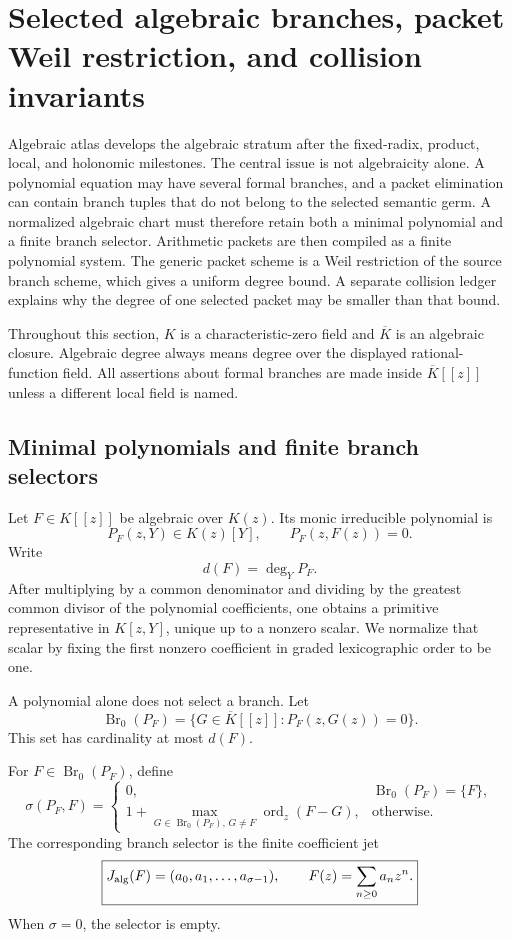 \section{Selected algebraic branches, packet Weil restriction, and collision invariants}
\label{sec:block10-algebraic}

Algebraic atlas develops the algebraic stratum after the fixed-radix, product, local, and holonomic milestones.  The central issue is not algebraicity alone.  A polynomial equation may have several formal branches, and a packet elimination can contain branch tuples that do not belong to the selected semantic germ.  A normalized algebraic chart must therefore retain both a minimal polynomial and a finite branch selector.  Arithmetic packets are then compiled as a finite polynomial system.  The generic packet scheme is a Weil restriction of the source branch scheme, which gives a uniform degree bound.  A separate collision ledger explains why the degree of one selected packet may be smaller than that bound.

Throughout this section, $K$ is a characteristic-zero field and $\overline K$ is an algebraic closure.  Algebraic degree always means degree over the displayed rational-function field.  All assertions about formal branches are made inside $\overline K[[z]]$ unless a different local field is named.

\subsection{Minimal polynomials and finite branch selectors}
\label{subsec:block10-branch-selector}

Let $F\in K[[z]]$ be algebraic over $K(z)$.  Its monic irreducible polynomial is
\[
 P_F(z,Y)\in K(z)[Y],
 \qquad
 P_F(z,F(z))=0.
\]
Write
\[
 d(F)=\deg_Y P_F.
\]
After multiplying by a common denominator and dividing by the greatest common divisor of the polynomial coefficients, one obtains a primitive representative in $K[z,Y]$, unique up to a nonzero scalar.  We normalize that scalar by fixing the first nonzero coefficient in graded lexicographic order to be one.

A polynomial alone does not select a branch.  Let
\[
 \operatorname{Br}_0(P_F)
 =
 \{G\in\overline K[[z]]:P_F(z,G(z))=0\}.
\]
This set has cardinality at most $d(F)$.

\begin{definition}
For $F\in\operatorname{Br}_0(P_F)$, define
\[
 \sigma(P_F,F)
 =
 \begin{cases}
 0,&\operatorname{Br}_0(P_F)=\{F\},\\[3pt]
 1+\displaystyle\max_{G\in\operatorname{Br}_0(P_F),\,G\neq F}
 \operatorname{ord}_z(F-G),&\text{otherwise}.
 \end{cases}
\]
The corresponding branch selector is the finite coefficient jet
\[
 \boxed{
 J_{\rm alg}(F)
 =
 (a_0,a_1,\ldots,a_{\sigma-1}),
 \qquad
 F(z)=\sum_{n\geq0}a_nz^n.}
\]
When $\sigma=0$, the selector is empty.
\end{definition}

